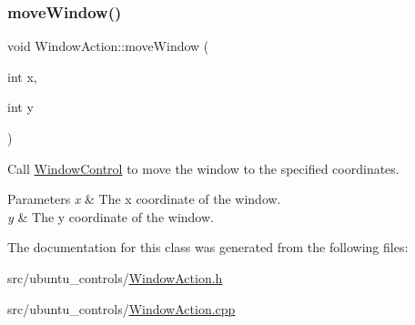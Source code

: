 \subsubsection{\texorpdfstring{move\+Window()}{moveWindow()}}
{\footnotesize\ttfamily void Window\+Action\+::move\+Window (\begin{DoxyParamCaption}\item[{int}]{x,  }\item[{int}]{y }\end{DoxyParamCaption})}

Call \hyperlink{classUbuntuController_1_1WindowControl}{Window\+Control} to move the window to the specified coordinates.


\begin{DoxyParams}{Parameters}
{\em x} & The x coordinate of the window. \\
\hline
{\em y} & The y coordinate of the window. \\
\hline
\end{DoxyParams}


The documentation for this class was generated from the following files\+:\begin{DoxyCompactItemize}
\item 
src/ubuntu\+\_\+controls/\hyperlink{WindowAction_8h}{Window\+Action.\+h}\item 
src/ubuntu\+\_\+controls/\hyperlink{WindowAction_8cpp}{Window\+Action.\+cpp}\end{DoxyCompactItemize}
